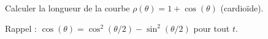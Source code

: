 \begin{exercice}\label{exoGeomAnal-0027}

Calculer la longueur de la courbe $\rho(\theta)= 1+\cos(\theta)$  (cardioïde). 


Rappel : $\cos(\theta)= \cos^2(\theta/2)-\sin^2(\theta/2)$ pour tout $t$.   


\end{exercice}

